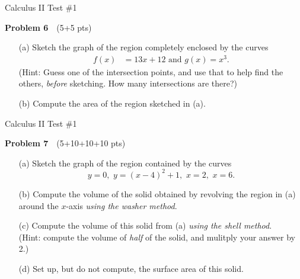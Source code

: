 \documentclass[10pt]{article}
\newcommand{\prob}[1]{\vspace{10mm} \noindent \textbf{Problem #1} \,\,}
\newcommand{\header}{
\begin{center}
Calculus II Test \#1
\end{center}

\vspace{2mm}

}
\begin{document}
\header

\prob{6} (5+5 pts) %

\begin{itemize}
\item[(a) ] Sketch the graph of the region completely enclosed by the curves 
\begin{align*}
f(x) & = 13x+12 \text{ and } g(x) = x^3.
\end{align*}
(Hint: Guess one of the intersection points, and use that to help find the others, \emph{before} sketching. How many intersections are there?)
\item[(b) ] Compute the area of the region sketched in (a).
\end{itemize}


\pagebreak

\header

\prob{7} (5+10+10+10 pts) %

\begin{itemize}
\item[(a) ] Sketch the graph of the region contained by the curves 
\[ y = 0, \,\, y = (x-4)^2 + 1, \,\, x = 2, \,\, x = 6. \] 
\item[(b) ] Compute the volume of the solid obtained by revolving the region in (a) around the $x$-axis \emph{using the washer method}.
\item[(c) ] Compute the volume of this solid from (a) \emph{using the shell method}. \\
(Hint: compute the volume of \emph{half} of the solid, and mulitply your answer by 2.)
\item[(d) ] Set up, but do not compute, the surface area of this solid.
\end{itemize}
\end{document}
